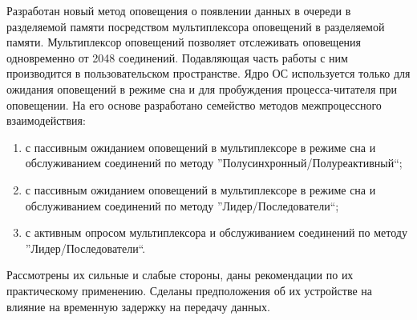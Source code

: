 Разработан новый метод оповещения о появлении данных в очереди в разделяемой памяти посредством мультиплексора оповещений в разделяемой памяти. Мультиплексор оповещений позволяет отслеживать оповещения одновременно от 2048 соединений. Подавляющая часть работы с ним производится в пользовательском пространстве. Ядро ОС используется только для ожидания оповещений в режиме сна и для пробуждения процесса-читателя при оповещении. 
На его основе разработано семейство методов межпроцессного взаимодействия:
\begin{enumerate}
\item с пассивным ожиданием оповещений в мультиплексоре в режиме сна и обслуживанием соединений по методу ''Полусинхронный/Полуреактивный``;
\item с пассивным ожиданием оповещений в мультиплексоре в режиме сна и обслуживанием соединений по методу ''Лидер/Последователи``;
\item с активным опросом мультиплексора и обслуживанием соединений по методу ''Лидер/Последователи``.
\end{enumerate}

Рассмотрены их сильные и слабые стороны, даны рекомендации по их практическому применению. Сделаны предположения об их устройстве на влияние на временную задержку на передачу данных.
